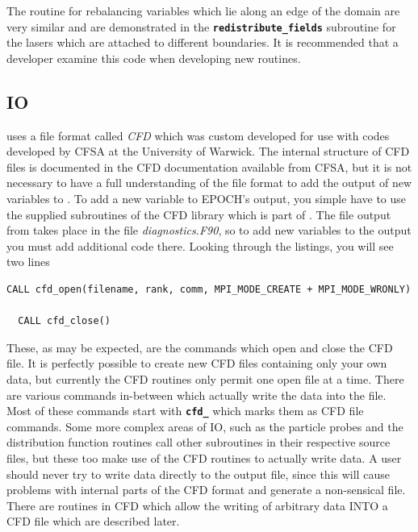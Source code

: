 \documentclass[12pt,a4paper]{article}
\newcommand{\simpleboxverbatim}{\begin{Verbatim}[obeytabs=true,frame=single,
  framerule=0.5mm,rulecolor=\color{warwickmid},formatcom=\color{black}]}
\newcommand{\inlinecode}[1]{{\color{warwickred} \bf\texttt{#1}}}
\newcommand{\EPOCH}{{\color{warwickdark}\fontfamily{phv}\selectfont{EPOCH}}}
\begin{document}
The routine for rebalancing variables which lie along an edge of the domain are
very similar and are demonstrated in the \inlinecode{redistribute\_fields}
subroutine for the lasers which are attached to different boundaries. It is
recommended that a developer examine this code when developing new routines.

\subsection{{\EPOCH} IO}

{\EPOCH} uses a file format called {\it CFD} which was custom developed for use
with codes developed by CFSA at the University of Warwick. The internal
structure of CFD files is documented in the CFD documentation available from
CFSA, but it is not necessary to have a full understanding of the file format
to add the output of new variables to \EPOCH. To add a new variable to EPOCH's
output, you simple have to use the supplied subroutines of the CFD library
which is part of \EPOCH. The file output from {\EPOCH} takes place in the file
{\it diagnostics.F90}, so to add new variables to the output you must add
additional code there. Looking through the listings, you will see two lines

\simpleboxverbatim
  CALL cfd_open(filename, rank, comm, MPI_MODE_CREATE + MPI_MODE_WRONLY)

  CALL cfd_close()
\end{Verbatim}

These, as may be expected, are the commands which open and close the CFD
file. It is perfectly possible to create new CFD files containing only your own
data, but currently the CFD routines only permit one open file at a time. There
are various commands in-between which actually write the data into the
file. Most of these commands start with \inlinecode{cfd\_} which marks them as
CFD file commands. Some more complex areas of IO, such as the particle probes
and the distribution function routines call other subroutines in their
respective source files, but these too make use of the CFD routines to actually
write data. A user should never try to write data directly to the output file,
since this will cause problems with internal parts of the CFD format and
generate a non-sensical file. There are routines in CFD which allow the writing
of arbitrary data INTO a CFD file which are described later.
\end{document}
